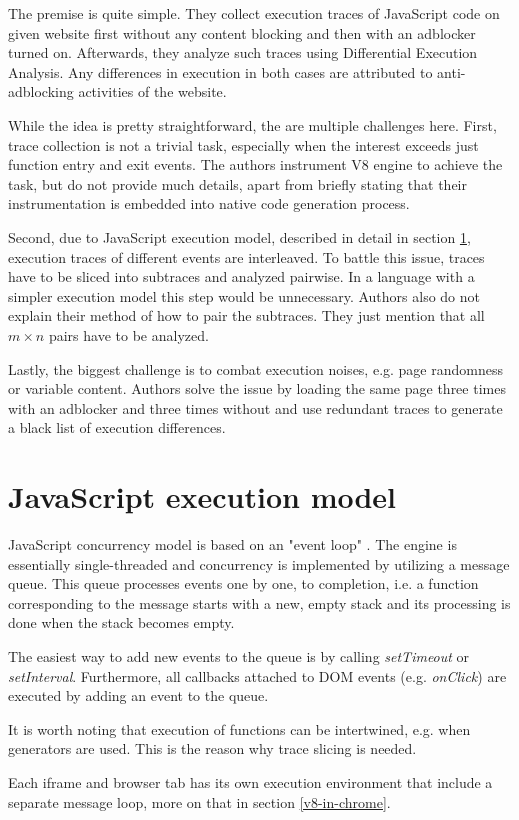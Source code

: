 The premise is quite simple. They collect execution traces of JavaScript code on given website
first without any content blocking and then with an adblocker turned on.
Afterwards, they analyze such traces using Differential Execution Analysis. Any differences in execution in both cases
are attributed to anti-adblocking activities of the website.

While the idea is pretty straightforward, the are multiple challenges here. 
First, trace collection is not a trivial task, especially when the interest exceeds just function entry and exit events.
The authors instrument V8 engine to achieve the task, but do not provide much details, apart from briefly stating that
their instrumentation is embedded into native code generation process.

Second, due to JavaScript execution model, described in detail in section \ref{js-exec-model}, execution traces of different
events are interleaved. To battle this issue, traces have to be sliced into subtraces and analyzed pairwise.
In a language with a simpler execution model this step would be unnecessary.
Authors also do not explain their method of how to pair the subtraces. They just mention that all $m \times n$ pairs 
have to be analyzed.

Lastly, the biggest challenge is to combat execution noises, e.g. page randomness or variable content.
Authors solve the issue by loading the same page three times with an adblocker and three times without and
use redundant traces to generate a black list of execution differences.


\section{JavaScript execution model}
\label{js-exec-model}

JavaScript concurrency model is based on an "event loop" \cite{mozilla:event-loop}. The engine is essentially single-threaded
and concurrency is implemented by utilizing a message queue. This queue processes events one by one, to completion, i.e.
a function corresponding to the message starts with a new, empty stack and its processing is done when the stack becomes empty.

The easiest way to add new events to the queue is by calling \emph{setTimeout} or \emph{setInterval}.
Furthermore, all callbacks attached to DOM events (e.g. \emph{onClick}) are executed by adding an event to the queue.

It is worth noting that execution of functions can be intertwined, e.g. when generators are used.
This is the reason why trace slicing is needed.

Each iframe and browser tab has its own execution environment that include a separate message loop, 
more on that in section \ref{v8-in-chrome}.
